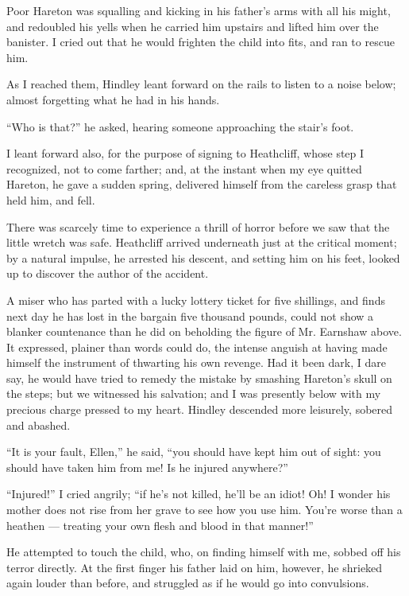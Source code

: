 \par Poor Hareton was squalling and kicking in his father's arms with all his might, and redoubled his yells when he carried him upstairs and lifted him over the banister. I cried out that he would frighten the child into fits, and ran to rescue him.
\par As I reached them, Hindley leant forward on the rails to listen to a noise below; almost forgetting what he had in his hands.
\par “Who is that?” he asked, hearing someone approaching the stair's foot.
\par I leant forward also, for the purpose of signing to Heathcliff, whose step I recognized, not to come farther; and, at the instant when my eye quitted Hareton, he gave a sudden spring, delivered himself from the careless grasp that held him, and fell.
\par There was scarcely time to experience a thrill of horror before we saw that the little wretch was safe. Heathcliff arrived underneath just at the critical moment; by a natural impulse, he arrested his descent, and setting him on his feet, looked up to discover the author of the accident.
\par A miser who has parted with a lucky lottery ticket for five shillings, and finds next day he has lost in the bargain five thousand pounds, could not show a blanker countenance than he did on beholding the figure of Mr. Earnshaw above. It expressed, plainer than words could do, the intense anguish at having made himself the instrument of thwarting his own revenge. Had it been dark, I dare say, he would have tried to remedy the mistake by smashing Hareton's skull on the steps; but we witnessed his salvation; and I was presently below with my precious charge pressed to my heart. Hindley descended more leisurely, sobered and abashed.
\par “It is your fault, Ellen,” he said, “you should have kept him out of sight: you should have taken him from me! Is he injured anywhere?”
\par “Injured!” I cried angrily; “if he's not killed, he'll be an idiot! Oh! I wonder his mother does not rise from her grave to see how you use him. You're worse than a heathen — treating your own flesh and blood in that manner!”
\par He attempted to touch the child, who, on finding himself with me, sobbed off his terror directly. At the first finger his father laid on him, however, he shrieked again louder than before, and struggled as if he would go into convulsions.
